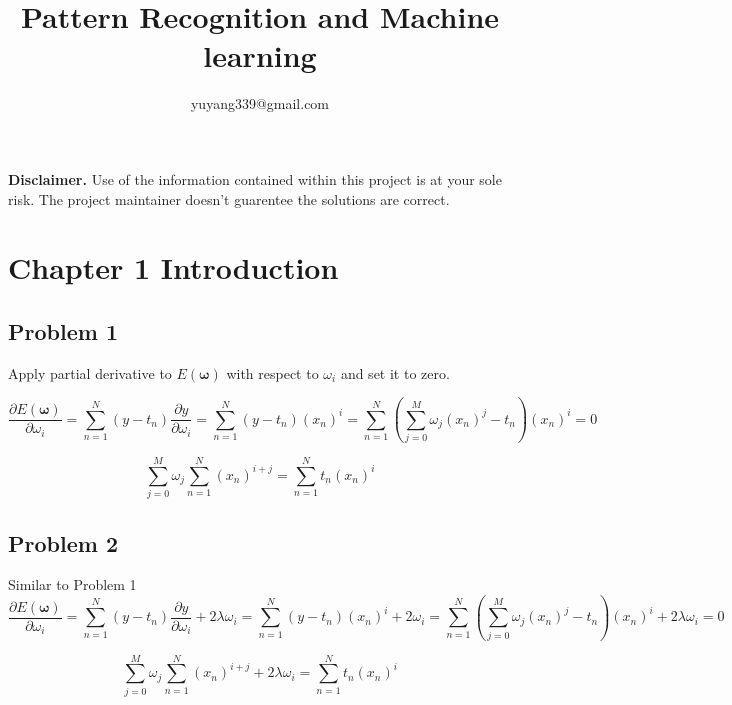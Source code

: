 \documentclass{article}
\author{yuyang339@gmail.com}
\title{Pattern Recognition and Machine learning}
\date{}
\begin{document}
\maketitle

\textbf{Disclaimer.} Use of the information contained within this project is at your sole risk. The project maintainer doesn't guarentee the solutions are correct.

\section*{Chapter 1 Introduction}
\subsection*{Problem 1}
\begin{flushleft}
Apply partial derivative to $E(\boldsymbol{\omega})$ with respect to $\omega_{i}$ and set it to zero.

\begin{equation}
\frac{\partial E(\boldsymbol{\omega})}{\partial \omega_{i}} = \sum_{n=1}^{N}{(y-t_{n})}\frac{\partial y}{\partial \omega_{i}} = \sum_{n=1}^{N}{(y-t_{n})}(x_{n})^i =\sum_{n=1}^{N}{(\sum_{j=0}^{M}\omega_{j}(x_{n})^{j}-t_{n})}(x_{n})^i = 0
\end{equation}

\begin{equation}
\sum_{j=0}^{M}\omega_{j}\sum_{n=1}^{N}{(x_{n})^{i+j}= \sum_{n=1}^{N}t_{n}}(x_{n})^i 
\end{equation}


\subsection*{Problem 2}
Similar to Problem 1
\begin{equation}
\frac{\partial E(\boldsymbol{\omega})}{\partial \omega_{i}} = \sum_{n=1}^{N}{(y-t_{n})}\frac{\partial y}{\partial \omega_{i}} + 2\lambda\omega_{i} = \sum_{n=1}^{N}{(y-t_{n})}(x_{n})^i + 2\omega_{i} =\sum_{n=1}^{N}{(\sum_{j=0}^{M}\omega_{j}(x_{n})^{j}-t_{n})}(x_{n})^i + 2\lambda\omega_{i}= 0
\end{equation}

\begin{equation}
\sum_{j=0}^{M}\omega_{j}\sum_{n=1}^{N}{(x_{n})^{i+j} + 2\lambda\omega_{i}= \sum_{n=1}^{N}t_{n}}(x_{n})^i 
\end{equation}

\end{flushleft}
\end{document}
